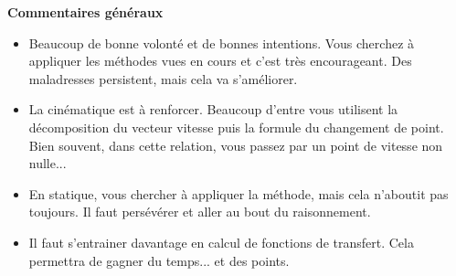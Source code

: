 \documentclass[10pt,fleqn]{book} %
\begin{document}
\renewcommand{\xxtitreexo}{Devoir du 8 novembre 2024}


\pagestyle{fancy}
\thispagestyle{plain}


\def\columnseprulecolor{\color{ocre}}
\setlength{\columnseprule}{0pt} 



\vspace{6cm}
%


\textbf{Commentaires généraux}
\begin{itemize}
\item Beaucoup de bonne volonté et de bonnes intentions. Vous cherchez à appliquer les méthodes vues en cours et c'est très encourageant. Des maladresses persistent, mais cela va s'améliorer.
\item La cinématique est à renforcer. Beaucoup d'entre vous utilisent la décomposition du vecteur vitesse puis la formule du changement de point. Bien souvent, dans cette relation, vous passez par un point de vitesse non nulle...
\item En statique, vous chercher à appliquer la méthode, mais cela n'aboutit pas toujours. Il faut persévérer et aller au bout du raisonnement.
\item Il faut s'entrainer davantage en calcul de fonctions de transfert. Cela permettra de gagner du temps... et des points.
\end{itemize}






%
\end{document}
